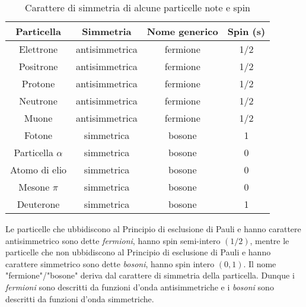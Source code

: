 \begin{table}[]
\centering
\begin{tabular}{cccc}
\hline
{\color[HTML]{000000} \textbf{Particella}} & {\color[HTML]{000000} \textbf{Simmetria}} & {\color[HTML]{000000} \textbf{Nome generico}} & {\color[HTML]{000000} \textbf{Spin (s)}} \\ \hline
{\color[HTML]{000000} Elettrone}           & {\color[HTML]{000000} antisimmetrica}     & {\color[HTML]{000000} fermione}               & {\color[HTML]{000000} 1/2}               \\
{\color[HTML]{000000} Positrone}           & {\color[HTML]{000000} antisimmetrica}     & {\color[HTML]{000000} fermione}               & {\color[HTML]{000000} 1/2}               \\
{\color[HTML]{000000} Protone}             & {\color[HTML]{000000} antisimmetrica}     & {\color[HTML]{000000} fermione}               & {\color[HTML]{000000} 1/2}               \\
{\color[HTML]{000000} Neutrone}            & {\color[HTML]{000000} antisimmetrica}     & {\color[HTML]{000000} fermione}               & {\color[HTML]{000000} 1/2}               \\
{\color[HTML]{000000} Muone}               & {\color[HTML]{000000} antisimmetrica}     & {\color[HTML]{000000} fermione}               & {\color[HTML]{000000} 1/2}               \\
{\color[HTML]{000000} Fotone}              & {\color[HTML]{000000} simmetrica}         & {\color[HTML]{000000} bosone}                 & {\color[HTML]{000000} 1}                 \\
{\color[HTML]{000000} Particella $\alpha$}    & {\color[HTML]{000000} simmetrica}         & {\color[HTML]{000000} bosone}                 & {\color[HTML]{000000} 0}                 \\
{\color[HTML]{000000} Atomo di elio}       & {\color[HTML]{000000} simmetrica}         & {\color[HTML]{000000} bosone}                 & {\color[HTML]{000000} 0}                 \\
{\color[HTML]{000000} Mesone $\pi$}           & {\color[HTML]{000000} simmetrica}         & {\color[HTML]{000000} bosone}                 & {\color[HTML]{000000} 0}                 \\
{\color[HTML]{000000} Deuterone}           & {\color[HTML]{000000} simmetrica}         & {\color[HTML]{000000} bosone}                 & {\color[HTML]{000000} 1}                 \\ \hline
\end{tabular}
\caption{Carattere di simmetria di alcune particelle note e spin}
\label{tab_car_sim}
\end{table}
Le particelle che ubbidiscono al Principio di esclusione di Pauli e hanno carattere antisimmetrico sono dette \textit{fermioni}, hanno spin semi-intero $(1/2)$, mentre le particelle che non ubbidiscono al Principio di esclusione di Pauli e hanno carattere simmetrico sono dette \textit{bosoni}, hanno spin intero $(0, 1)$.
Il nome "fermione"/"bosone" deriva dal carattere di simmetria della particella.
Dunque i \textit{fermioni} sono descritti da funzioni d'onda antisimmetriche e i \textit{bosoni} sono descritti da funzioni d'onda simmetriche.

